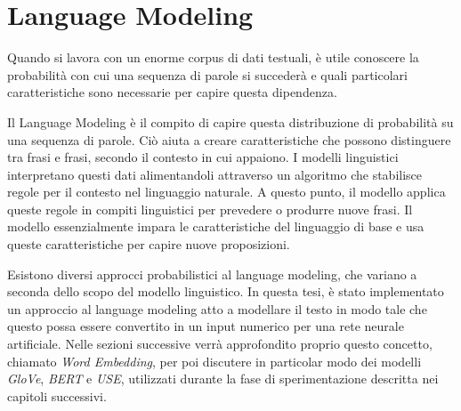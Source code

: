 \section{Language Modeling}
Quando si lavora con un enorme corpus di dati testuali, è utile conoscere la probabilità con cui una sequenza di parole si succederà e quali particolari caratteristiche sono necessarie per capire questa dipendenza.

Il Language Modeling è il compito di capire questa distribuzione di probabilità su una sequenza di parole. Ciò aiuta a creare caratteristiche che possono distinguere tra frasi e frasi, secondo il contesto in cui appaiono.
I modelli linguistici interpretano questi dati alimentandoli attraverso un algoritmo che stabilisce regole per il contesto nel linguaggio naturale. A questo punto, il modello applica queste regole in compiti linguistici per prevedere o produrre nuove frasi. Il modello essenzialmente impara le caratteristiche del linguaggio di base e usa queste caratteristiche per capire nuove proposizioni.

Esistono diversi approcci probabilistici al language modeling, che variano a seconda dello scopo del modello linguistico. In questa tesi, è stato implementato un approccio al language modeling atto a modellare il testo in modo tale che questo possa essere convertito in un input numerico per una rete neurale artificiale. Nelle sezioni successive verrà approfondito proprio questo concetto, chiamato \textit{Word Embedding}, per poi discutere in particolar modo dei modelli \textit{GloVe}\textsuperscript{\cite{pennington-etal-2014-glove}}, \textit{BERT}\textsuperscript{\cite{devlin2019bert}} e \textit{USE}\textsuperscript{\cite{cer2018universal}}, utilizzati durante la fase di sperimentazione descritta nei capitoli successivi.




